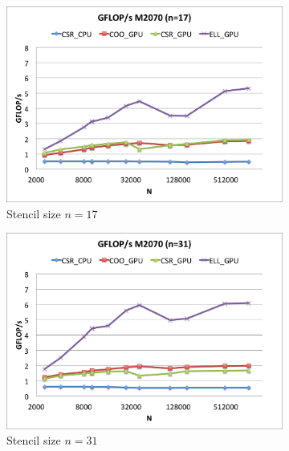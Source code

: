 \documentclass{report}
\begin{document}
\begin{figure} 
\centering
\begin{subfigure}[t]{0.48\textwidth}
\centering
\includegraphics[width=\textwidth]{gpu_content/cascade_spmv/gflops_cascade_m2070_n17.png}
\caption{Stencil size $n=17$}
\label{fig:gflops_cascade_m2070_n17}
\end{subfigure}
\quad
\begin{subfigure}[t]{0.48\textwidth}
\centering
\includegraphics[width=\textwidth]{gpu_content/cascade_spmv/gflops_cascade_m2070_n31.png}
\caption{Stencil size $n=31$}
\label{fig:gflops_cascade_m2070_n31}
\end{subfigure}
\begin{subfigure}[t]{0.48\textwidth}
\centering

\end{subfigure}
\end{figure}
\end{document}
